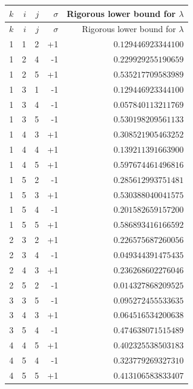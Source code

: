 \begin{longtable}{@{}rrrrr@{}}
\toprule
$k$ & $i$ & $j$ & $\sigma$ & Rigorous lower bound for $\lambda$\\\midrule
\endfirsthead
\toprule $k$ & $i$ & $j$ & $\sigma$ & Rigorous lower bound for $\lambda$\\\midrule
\endhead
1 & 1 & 2 & +1 & $0.129446923344100$\\
1 & 2 & 4 & -1 & $0.229929255190659$\\
1 & 2 & 5 & +1 & $0.535217709583989$\\
1 & 3 & 1 & -1 & $0.129446923344100$\\
1 & 3 & 4 & -1 & $0.057840113211769$\\
1 & 3 & 5 & -1 & $0.530198209561133$\\
1 & 4 & 3 & +1 & $0.308521905463252$\\
1 & 4 & 4 & +1 & $0.139211391663900$\\
1 & 4 & 5 & +1 & $0.597674461496816$\\
1 & 5 & 2 & -1 & $0.285612993751481$\\
1 & 5 & 3 & +1 & $0.530388040041575$\\
1 & 5 & 4 & -1 & $0.201582659157200$\\
1 & 5 & 5 & +1 & $0.586893416166592$\\
2 & 3 & 2 & +1 & $0.226575687260056$\\
2 & 3 & 4 & -1 & $0.049344391475435$\\
2 & 4 & 3 & +1 & $0.236268602276046$\\
2 & 5 & 2 & -1 & $0.014327868209525$\\
3 & 3 & 5 & -1 & $0.095272455533635$\\
3 & 4 & 3 & +1 & $0.064516534200638$\\
3 & 5 & 4 & -1 & $0.474638071515489$\\
4 & 4 & 5 & +1 & $0.402325538503183$\\
4 & 5 & 4 & -1 & $0.323779269327310$\\
4 & 5 & 5 & +1 & $0.413106583833407$\\
\bottomrule
\end{longtable}

